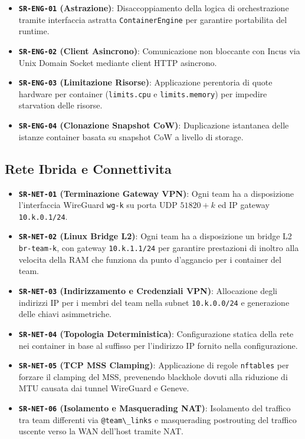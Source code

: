 \begin{itemize}
\tightlist
\item
  \textbf{\passthrough{\lstinline!SR-ENG-01!} (Astrazione)}:
  Disaccoppiamento della logica di orchestrazione tramite interfaccia
  astratta \passthrough{\lstinline!ContainerEngine!} per garantire
  portabilita del runtime.
\item
  \textbf{\passthrough{\lstinline!SR-ENG-02!} (Client Asincrono)}:
  Comunicazione non bloccante con Incus via Unix Domain Socket mediante
  client HTTP asincrono.
\item
  \textbf{\passthrough{\lstinline!SR-ENG-03!} (Limitazione Risorse)}:
  Applicazione perentoria di quote hardware per container
  (\passthrough{\lstinline!limits.cpu!} e
  \passthrough{\lstinline!limits.memory!}) per impedire starvation delle
  risorse.
\item
  \textbf{\passthrough{\lstinline!SR-ENG-04!} (Clonazione Snapshot
  CoW)}: Duplicazione istantanea delle istanze container basata su
  snapshot CoW a livello di storage.
\end{itemize}

\subsection{Rete Ibrida e
Connettivita}\label{rete-ibrida-e-connettivita}

\begin{itemize}
\tightlist
\item
  \textbf{\passthrough{\lstinline!SR-NET-01!} (Terminazione Gateway
  VPN)}: Ogni team ha a disposizione l'interfaccia WireGuard
  \passthrough{\lstinline!wg-k!} su porta UDP \(51820+k\) ed IP gateway
  \passthrough{\lstinline!10.k.0.1/24!}.
\item
  \textbf{\passthrough{\lstinline!SR-NET-02!} (Linux Bridge L2)}: Ogni
  team ha a disposizione un bridge L2
  \passthrough{\lstinline!br-team-k!}, con gateway
  \passthrough{\lstinline!10.k.1.1/24!} per garantire prestazioni di
  inoltro alla velocita della RAM che funziona da punto d'aggancio per i
  container del team.
\item
  \textbf{\passthrough{\lstinline!SR-NET-03!} (Indirizzamento e
  Credenziali VPN)}: Allocazione degli indirizzi IP per i membri del
  team nella subnet \passthrough{\lstinline!10.k.0.0/24!} e generazione
  delle chiavi asimmetriche.
\item
  \textbf{\passthrough{\lstinline!SR-NET-04!} (Topologia
  Deterministica)}: Configurazione statica della rete nei container in
  base al suffisso per l'indirizzo IP fornito nella configurazione.
\item
  \textbf{\passthrough{\lstinline!SR-NET-05!} (TCP MSS Clamping)}:
  Applicazione di regole \passthrough{\lstinline!nftables!} per forzare
  il clamping del MSS, prevenendo blackhole dovuti alla riduzione di MTU
  causata dai tunnel WireGuard e Geneve.
\item
  \textbf{\passthrough{\lstinline!SR-NET-06!} (Isolamento e Masquerading
  NAT)}: Isolamento del traffico tra team differenti via
  \passthrough{\lstinline!@team\_links!} e masquerading postrouting del
  traffico uscente verso la WAN dell'host tramite NAT.
\end{itemize}

